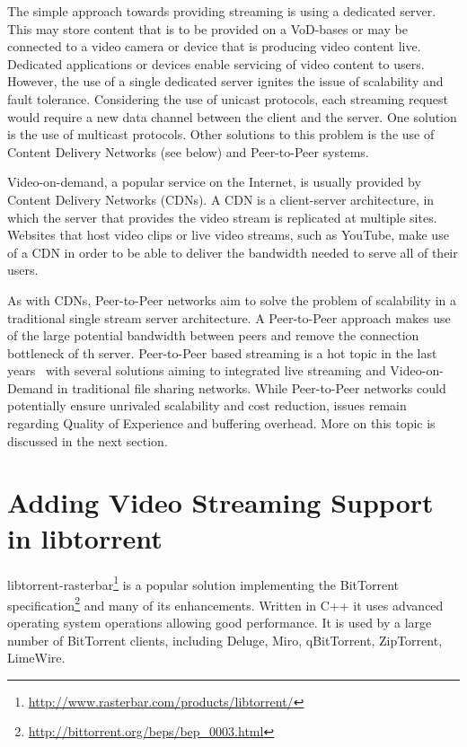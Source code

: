 The simple approach towards providing streaming is using a dedicated server.
This may store content that is to be provided on a VoD-bases or may be
connected to a video camera or device that is producing video content live.
Dedicated applications or devices enable servicing of video content to users.
However, the use of a single dedicated server ignites the issue of scalability
and fault tolerance. Considering the use of unicast protocols, each streaming
request would require a new data channel between the client and the server.
One solution is the use of multicast protocols. Other solutions to this
problem is the use of Content Delivery Networks (see below) and Peer-to-Peer
systems.

Video-on-demand, a popular service on the Internet, is usually provided by
Content Delivery Networks (CDNs). A CDN is a client-server architecture, in
which the server that provides the video stream is replicated at multiple
sites. Websites that host video clips or live video streams, such as YouTube,
make use of a CDN in order to be able to deliver the bandwidth needed to serve
all of their users.

As with CDNs, Peer-to-Peer networks aim to solve the problem of scalability in
a traditional single stream server architecture. A Peer-to-Peer approach makes
use of the large potential bandwidth between peers and remove the connection
bottleneck of th server. Peer-to-Peer based streaming is a hot topic in the
last years~\cite{p2p-streaming-survey} with several solutions aiming to
integrated live streaming and Video-on-Demand in traditional file sharing
networks. While Peer-to-Peer networks could potentially ensure unrivaled
scalability and cost reduction, issues remain regarding Quality of Experience
and buffering overhead. More on this topic is discussed in the next section.

\section{Adding Video Streaming Support in libtorrent}
\label{sec:multimedia-dist:libtorrent}

libtorrent-rasterbar\footnote{\url{http://www.rasterbar.com/products/libtorrent/}}
is a popular solution implementing the BitTorrent
specification\footnote{\url{http://bittorrent.org/beps/bep\_0003.html}} and many of
its enhancements.  Written in C++ it uses advanced operating system operations
allowing good performance. It is used by a large number of BitTorrent clients,
including Deluge, Miro, qBitTorrent, ZipTorrent, LimeWire.


